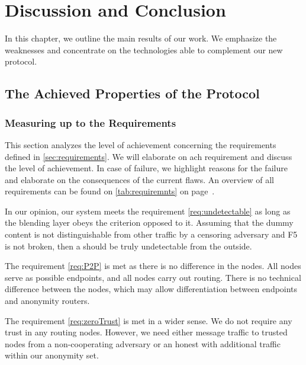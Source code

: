 
\part{Discussion and Conclusion}

In this chapter, we outline the main results of our work. We emphasize the weaknesses and concentrate on the technologies able to complement our new protocol.

\chapter{The Achieved Properties of the Protocol}
\section{Measuring up to the Requirements\label{sec:reqDiscussion}}
This section analyzes the level of achievement concerning the requirements defined in \cref{sec:requirements}. We will elaborate on ach requirement and discuss the level of achievement. In case of failure, we highlight reasons for the failure and elaborate on the consequences of the current flaws. An overview of all requirements can be found on \cref{tab:requiremnts} on page~\pageref{tab:requiremnts}.

In our opinion, our system meets the requirement \ref{req:undetectable} as long as the blending layer obeys the criterion opposed to it. Assuming that the dummy content is not distinguishable from other traffic by a censoring adversary and F5 is not broken, then a \VortexNode{} should be truly undetectable from the outside.

The requirement \ref{req:P2P} is met as there is no difference in the nodes. All nodes serve as possible endpoints, and all nodes carry out routing. There is no technical difference between the nodes, which may allow differentiation between endpoints and anonymity routers.

The requirement \ref{req:zeroTrust} is met in a wider sense. We do not require any trust in any routing nodes. However, we need either message traffic to trusted nodes from a non-cooperating adversary or an honest \VortexNodes{} with additional traffic within our anonymity set. 

